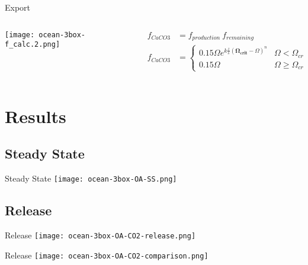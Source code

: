 \begin{frame}{Export}
    \begin{columns}
        \begin{column}{0.45\linewidth}
            \centering
            \texttt{[image: ocean-3box-f\_calc.2.png]}
        \end{column}
        \begin{column}{0.55\linewidth}
            \begin{align*}
                f_{CaCO3} &= f_{production} ~ f_{remaining} \\
                f_{CaCO3} &= \begin{cases}
                    0.15 \Omega e^{k \frac{z}{s} (\mathbf{\Omega_{crit}} - \Omega)^n} & \Omega < \Omega_{crit} \\
                    0.15 \Omega & \Omega \geq \Omega_{crit}
                \end{cases}
            \end{align*}
        \end{column}
    \end{columns}
\end{frame}

\section{Results}

\subsection{Steady State}

\begin{frame}{Steady State}
    \centering
    \texttt{[image: ocean-3box-OA-SS.png]}

\end{frame}

\subsection{ Release}

\begin{frame}{ Release}
    \centering
    \texttt{[image: ocean-3box-OA-CO2-release.png]}
\end{frame}

\begin{frame}{ Release}
    \centering
    \texttt{[image: ocean-3box-OA-CO2-comparison.png]}
\end{frame}

